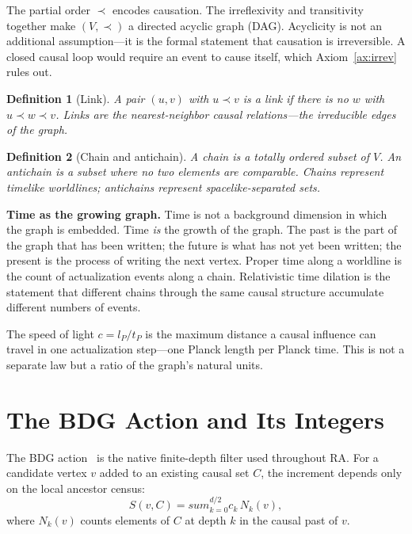 \documentclass[11pt]{article}
\def\sum{sum}%
\newtheorem{definition}{Definition}
\begin{document}
The partial order $\prec$ encodes causation. The irreflexivity and transitivity together make $(V,\prec)$ a directed acyclic graph (DAG). Acyclicity is not an additional assumption---it is the formal statement that causation is irreversible. A closed causal loop would require an event to cause itself, which Axiom~\ref{ax:irrev} rules out.

\begin{definition}[Link]
A pair $(u,v)$ with $u\prec v$ is a \emph{link} if there is no $w$ with $u\prec w\prec v$. Links are the nearest-neighbor causal relations---the irreducible edges of the graph.
\end{definition}

\begin{definition}[Chain and antichain]
A \emph{chain} is a totally ordered subset of $V$. An \emph{antichain} is a subset where no two elements are comparable. Chains represent timelike worldlines; antichains represent spacelike-separated sets.
\end{definition}

\textbf{Time as the growing graph.} Time is not a background dimension in which the graph is embedded. Time \emph{is} the growth of the graph. The past is the part of the graph that has been written; the future is what has not yet been written; the present is the process of writing the next vertex. Proper time along a worldline is the count of actualization events along a chain. Relativistic time dilation is the statement that different chains through the same causal structure accumulate different numbers of events.

The speed of light $c=l_P/t_P$ is the maximum distance a causal influence can travel in one actualization step---one Planck length per Planck time. This is not a separate law but a ratio of the graph's natural units.

\section{The BDG Action and Its Integers}
\label{sec:bdg}

The BDG action~\cite{Benincasa2010} is the native finite-depth filter used throughout RA. For a candidate vertex $v$ added to an existing causal set $C$, the increment depends only on the local ancestor census:
\begin{equation}
S(v,C) = \sum_{k=0}^{d/2} c_k \, N_k(v),
\end{equation}
where $N_k(v)$ counts elements of $C$ at depth $k$ in the causal past of $v$.
\end{document}
